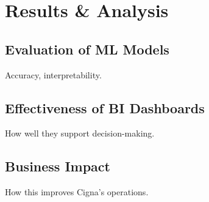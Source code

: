 \chapter{Results \& Analysis}

\section{Evaluation of ML Models}
Accuracy, interpretability.

\section{Effectiveness of BI Dashboards}
How well they support decision-making.

\section{Business Impact}
How this improves Cigna’s operations.